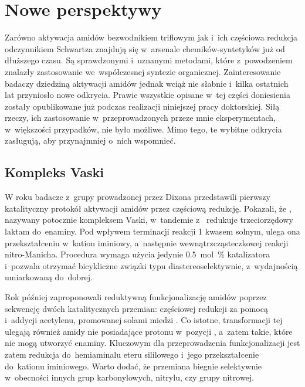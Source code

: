 \section{Nowe perspektywy}\label{literature:new}
Zarówno aktywacja amidów bezwodnikiem triflowym jak i~ich częściowa redukcja odczynnikiem
  Schwartza znajdują się w~arsenale chemików-syntetyków już od dłuższego czasu.
Są sprawdzonymi i~uznanymi metodami, które z~powodzeniem znalazły zastosowanie
  we~współczesnej syntezie organicznej.
Zainteresowanie badaczy dziedziną aktywacji amidów jednak wciąż nie słabnie i~kilka
  ostatnich lat przyniosło nowe odkrycia.
Prawie wszystkie opisane w~tej części doniesienia zostały opublikowane już podczas
  realizacji niniejszej pracy doktorskiej.
Siłą rzeczy, ich zastosowanie w~przeprowadzonych przeze mnie eksperymentach, w~większości
  przypadków, nie było możliwe.
Mimo tego, te wybitne odkrycia zasługują, aby przynajmniej o~nich wspomnieć.

\subsection{Kompleks Vaski}\label{literature:new:vasca}
W roku \citeyear{gregory15} badacze z~grupy prowadzonej przez Dixona przedstawili pierwszy
  katalityczny protokół aktywacji amidów przez częściową redukcję.
Pokazali, że \vaska{}, nazywany potocznie kompleksem Vaski, w~tandemie z~
  redukuje trzeciorzędowy laktam  do~enaminy.
Pod wpływem terminacji reakcji \SI{1}{\Molar} kwasem solnym, ulega ona przekształceniu
  w~kation iminiowy, a~następnie wewnątrzcząsteczkowej reakcji nitro-Manicha.
Procedura wymaga użycia jedynie \SI{0.5}{\mole\percent} katalizatora i~pozwala otrzymać
  bicykliczne związki typu  diastereoselektywnie, z~wydajnością
  umiarkowaną do~dobrej.

Rok później \citeauthor{huang16c} zaproponowali reduktywną funkcjonalizację amidów poprzez
  sekwencję dwóch katalitycznych przemian: częściowej redukcji za pomocą \vaska{} i~addycji
  acetylenu, promowanej solami miedzi .
Co istotne, transformacji tej ulegają również amidy nie posiadające protonu w~pozycji \textalpha{},
  a~zatem takie, które nie mogą utworzyć enaminy.
Kluczowym dla przeprowadzenia funkcjonalizacji jest zatem redukcja do~hemiaminalu eteru sililowego
  i~jego przekształcenie do~kationu iminiowego.
Warto dodać, że przemiana biegnie selektywnie w~obecności innych grup karbonylowych, nitrylu,
  czy grupy nitrowej.

